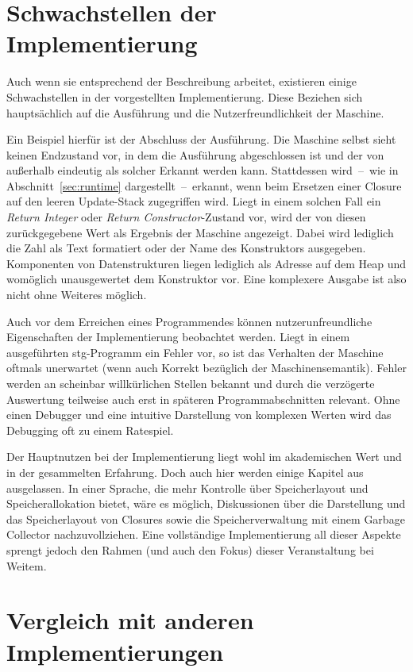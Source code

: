 \section{Schwachstellen der Implementierung}

Auch wenn sie entsprechend der Beschreibung arbeitet, existieren einige Schwachstellen in der vorgestellten Implementierung.
Diese Beziehen sich hauptsächlich auf die Ausführung und die Nutzerfreundlichkeit der Maschine.

Ein Beispiel hierfür ist der Abschluss der Ausführung.
Die Maschine selbst sieht keinen Endzustand vor, in dem die Ausführung abgeschlossen ist und der von außerhalb eindeutig als solcher Erkannt werden kann.
Stattdessen wird~--~wie in Abschnitt~\ref{sec:runtime} dargestellt~--~erkannt, wenn beim Ersetzen einer Closure auf den leeren Update-Stack zugegriffen wird.
Liegt in einem solchen Fall ein \textit{Return Integer} oder \textit{Return Constructor}-Zustand vor, wird der von diesen zurückgegebene Wert als Ergebnis der Maschine angezeigt.
Dabei wird lediglich die Zahl als Text formatiert oder der Name des Konstruktors ausgegeben.
Komponenten von Datenstrukturen liegen lediglich als Adresse auf dem Heap und womöglich unausgewertet dem Konstruktor vor.
Eine komplexere Ausgabe ist also nicht ohne Weiteres möglich.

Auch vor dem Erreichen eines Programmendes können nutzerunfreundliche Eigenschaften der Implementierung beobachtet werden.
Liegt in einem ausgeführten \gls{stg}-Programm ein Fehler vor, so ist das Verhalten der Maschine oftmals unerwartet (wenn auch Korrekt bezüglich der Maschinensemantik).
Fehler werden an scheinbar willkürlichen Stellen bekannt und durch die verzögerte Auswertung teilweise auch erst in späteren Programmabschnitten relevant.
Ohne einen Debugger und eine intuitive Darstellung von komplexen Werten wird das Debugging oft zu einem Ratespiel.

Der Hauptnutzen bei der Implementierung liegt wohl im akademischen Wert und in der gesammelten Erfahrung.
Doch auch hier werden einige Kapitel aus~\cite{Jones_StockHardwareSTG} ausgelassen.
In einer Sprache, die mehr Kontrolle über Speicherlayout und Speicherallokation bietet, wäre es möglich, Diskussionen über die Darstellung und das Speicherlayout von Closures sowie die Speicherverwaltung mit einem Garbage Collector nachzuvollziehen.
Eine vollständige Implementierung all dieser Aspekte sprengt jedoch den Rahmen (und auch den Fokus) dieser Veranstaltung bei Weitem.


\section{Vergleich mit anderen Implementierungen}

